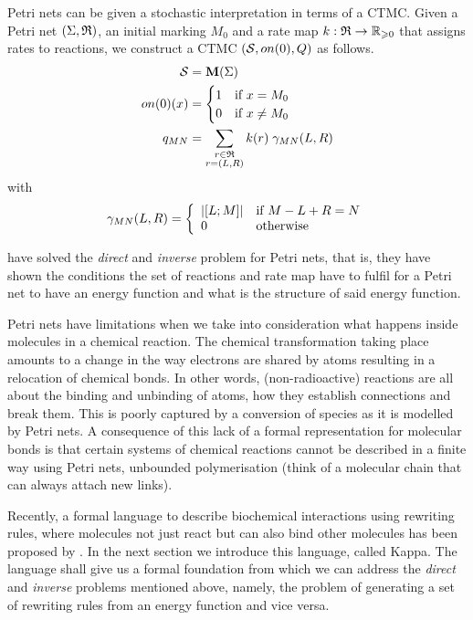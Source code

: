 Petri nets can be given a stochastic interpretation
in terms of a CTMC.
Given a Petri net $\left(\Sigma, \mathfrak{R}\right)$,
an initial marking $M_0$ and
a rate map $k: \mathfrak{R} \to \mathbb{R}_{\geqslant 0}$
that assigns rates to reactions,
we construct a CTMC $\left(\mathcal{S}, on(0), Q\right)$ as follows.
\begin{align*}
  \mathcal{S} &= \mathbf{M}(\Sigma) \\
  on(0)(x) &= \begin{cases}
    1 \quad\text{if } x = M_0 \\
    0 \quad\text{if } x \neq M_0
  \end{cases} \\
  q_{MN} &= \sum_{\substack{r \in \mathfrak{R}\\r = \left(L,R\right)}}
    k(r) \; \gamma_{MN}(L,R)
\end{align*}
with
\begin{equation*}
  \gamma_{MN}(L,R) = \left\{\begin{array}{ll}
    \left\lvert \left[L;M\right] \right\rvert & \text{if } M - L + R = N \\
    0 & \text{otherwise}
  \end{array}\right.
\end{equation*}

\citet{et2} have solved
the \emph{direct} and \emph{inverse} problem for Petri nets,
that is, they have shown the conditions
the set of reactions and rate map have to fulfil
for a Petri net to have an energy function
and what is the structure of said energy function.

Petri nets have limitations when we take into consideration
what happens inside molecules in a chemical reaction.
The chemical transformation taking place amounts to
a change in the way electrons are shared by atoms
resulting in a relocation of chemical bonds.
In other words, (non-radioactive) reactions are all about
the binding and unbinding of atoms,
how they establish connections and break them.
This is poorly captured by a conversion of species
as it is modelled by Petri nets.
A consequence of this lack of a formal representation for
molecular bonds is that certain systems of chemical reactions
cannot be described in a finite way using Petri nets,
\eg unbounded polymerisation
(think of a molecular chain that can always attach new links).

Recently,
a formal language to describe biochemical interactions
using rewriting rules,
where molecules not just react but can also bind other molecules
has been proposed by \citet{kappa}.
In the next section we introduce this language, called Kappa.
The language shall give us a formal foundation
from which we can address
the \emph{direct} and \emph{inverse} problems mentioned above,
namely, the problem of generating a set of rewriting rules
from an energy function and vice versa.


